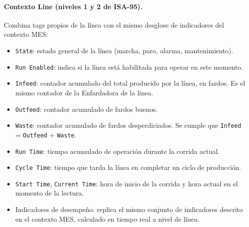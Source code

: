 \paragraph{Contexto Line (niveles 1 y 2 de ISA-95).} Combina tags propios de la línea con el mismo desglose de indicadores del contexto MES:
\begin{itemize}
    \item \texttt{State}: estado general de la línea (marcha, paro, alarma, mantenimiento).
    \item \texttt{Run Enabled}: indica si la línea está habilitada para operar en este momento.
    \item \texttt{Infeed}: contador acumulado del total producido por la línea, en fardos. Es el mismo contador de la Enfardadora de la línea.
    \item \texttt{Outfeed}: contador acumulado de fardos buenos.
    \item \texttt{Waste}: contador acumulado de fardos desperdiciados. Se cumple que \texttt{Infeed} = \texttt{Outfeed} + \texttt{Waste}.
    \item \texttt{Run Time}: tiempo acumulado de operación durante la corrida actual.
    \item \texttt{Cycle Time}: tiempo que tarda la línea en completar un ciclo de producción.
    \item \texttt{Start Time}, \texttt{Current Time}: hora de inicio de la corrida y hora actual en el momento de la lectura.
    \item Indicadores de desempeño: replica el mismo conjunto de indicadores descrito en el contexto MES, calculado en tiempo real a nivel de línea.
\end{itemize}

